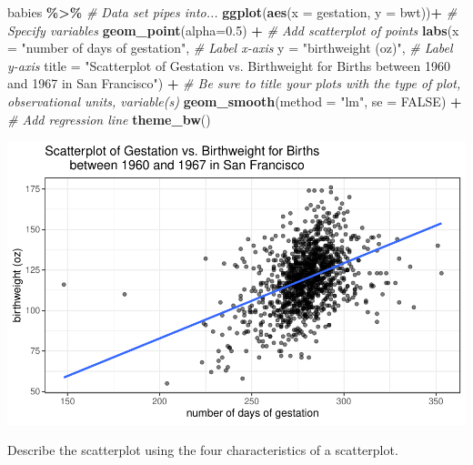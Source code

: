 \documentclass[
]{report}
\newenvironment{Shaded}{\begin{snugshade}}{\end{snugshade}}
\newcommand{\AttributeTok}[1]{\textcolor[rgb]{0.13,0.29,0.53}{#1}}
\newcommand{\CommentTok}[1]{\textcolor[rgb]{0.56,0.35,0.01}{\textit{#1}}}
\newcommand{\ConstantTok}[1]{\textcolor[rgb]{0.56,0.35,0.01}{#1}}
\newcommand{\FloatTok}[1]{\textcolor[rgb]{0.00,0.00,0.81}{#1}}
\newcommand{\FunctionTok}[1]{\textcolor[rgb]{0.13,0.29,0.53}{\textbf{#1}}}
\newcommand{\NormalTok}[1]{#1}
\newcommand{\SpecialCharTok}[1]{\textcolor[rgb]{0.81,0.36,0.00}{\textbf{#1}}}
\newcommand{\StringTok}[1]{\textcolor[rgb]{0.31,0.60,0.02}{#1}}
\begin{document}
\begin{Shaded}
\begin{Highlighting}[]
\NormalTok{babies }\SpecialCharTok{\%\textgreater{}\%} \CommentTok{\# Data set pipes into...}
\FunctionTok{ggplot}\NormalTok{(}\FunctionTok{aes}\NormalTok{(}\AttributeTok{x =}\NormalTok{ gestation, }\AttributeTok{y =}\NormalTok{ bwt))}\SpecialCharTok{+}  \CommentTok{\# Specify variables}
  \FunctionTok{geom\_point}\NormalTok{(}\AttributeTok{alpha=}\FloatTok{0.5}\NormalTok{) }\SpecialCharTok{+}  \CommentTok{\# Add scatterplot of points}
  \FunctionTok{labs}\NormalTok{(}\AttributeTok{x =} \StringTok{"number of days of gestation"}\NormalTok{,  }\CommentTok{\# Label x{-}axis}
       \AttributeTok{y =} \StringTok{"birthweight (oz)"}\NormalTok{,  }\CommentTok{\# Label y{-}axis}
       \AttributeTok{title =} \StringTok{"Scatterplot of Gestation vs. Birthweight for Births}
\StringTok{       between 1960 and 1967 in San Francisco"}\NormalTok{) }\SpecialCharTok{+} 
    \CommentTok{\# Be sure to title your plots with the type of plot, observational units, variable(s)}
  \FunctionTok{geom\_smooth}\NormalTok{(}\AttributeTok{method =} \StringTok{"lm"}\NormalTok{, }\AttributeTok{se =} \ConstantTok{FALSE}\NormalTok{) }\SpecialCharTok{+} \CommentTok{\# Add regression line}
    \FunctionTok{theme\_bw}\NormalTok{()}
\end{Highlighting}
\end{Shaded}

\begin{center}\includegraphics[width=0.8\linewidth]{13-VN13-regression_files/figure-latex/unnamed-chunk-2-1} \end{center}

Describe the scatterplot using the four characteristics of a scatterplot.

\vspace{1in}

\end{document}
